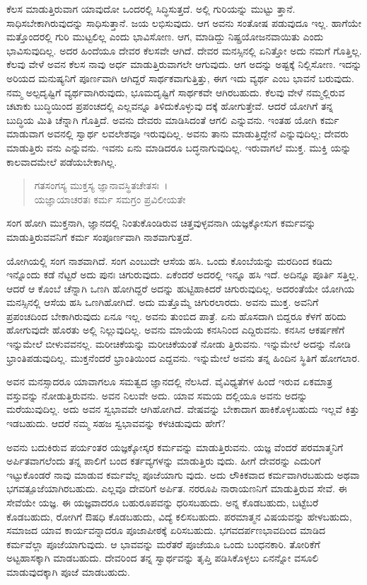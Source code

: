 ಕೆಲಸ ಮಾಡುತ್ತಿರುವಾಗ ಯಾವುದೋ ಒಂದರಲ್ಲಿ ಸಿದ್ಧಿಸುತ್ತದೆ. ಅಲ್ಲಿ ಗುರಿಯನ್ನು ಮುಟ್ಟು ತ್ತಾನೆ. ಸಾಧಿಸಬೇಕಾಗಿರುವುದನ್ನು ಸಾಧಿಸುತ್ತಾನೆ. ಜಯ ಲಭಿಸುವುದು. ಆಗ ಅವನು ಸಂತೋಷ ಪಡುವುದೂ ಇಲ್ಲ. ಹಾಗೆಯೇ ಮತ್ತೊಂದರಲ್ಲಿ ಗುರಿ ಮುಟ್ಟಲಿಲ್ಲ ಎಂದು ಭಾವಿಸೋಣ. ಆಗ, ಮಾಡಿದ್ದು ನಿಷ್ಪ್ರಯೋಜನವಾಯಿತು ಎಂದು ಭಾವಿಸುವುದಿಲ್ಲ. ಅದರ ಹಿಂದೆಯೂ ದೇವರ ಕೆಲಸವೇ ಆಗಿದೆ. ದೇವರ ಮನಸ್ಸಿನಲ್ಲಿ ಏನಿತ್ತೋ ಅದು ನಮಗೆ ಗೊತ್ತಿಲ್ಲ. ಕೆಲವು ವೇಳೆ ಅವನ ಕೆಲಸ ನಾವು ಅರ್ಧ ಮಾಡುತ್ತಿರುವಾಗಲೇ ಆಗುವುದು. ಆಗ ಅದನ್ನು ಅಷ್ಟಕ್ಕೆ ನಿಲ್ಲಿಸೋಣ. ಇದನ್ನು ಅರಿಯದ ಮನುಷ್ಯನಿಗೆ ಪೂರ್ಣವಾಗಿ ಆಗಿದ್ದರೆ ಸಾರ್ಥಕವಾಗುತ್ತಿತ್ತು, ಈಗ ಇದು ವ್ಯರ್ಥ ಎಂಬ ಭಾವನೆ ಬರುವುದು. ನಮ್ಮ ಅಲ್ಪದೃಷ್ಟಿಗೆ ವ್ಯರ್ಥವಾಗಿರುವುದು, ಭೂಮದೃಷ್ಟಿಗೆ ಸಾರ್ಥಕವೇ ಆಗಿರಬಹುದು. ಕೆಲವು ವೇಳೆ ನಮ್ಮಲ್ಲಿರುವ ಚಟಾಕು ಬುದ್ಧಿಯಿಂದ ಪ್ರಪಂಚದಲ್ಲಿ ಎಲ್ಲವನ್ನೂ ತಿಳಿದುಕೊಳ್ಳುವು ದಕ್ಕೆ ಹೋಗುತ್ತೇವೆ. ಆದರೆ ಯೋಗಿಗೆ ತನ್ನ ಬುದ್ಧಿಯ ಮಿತಿ ಚೆನ್ನಾಗಿ ಗೊತ್ತಿದೆ. ಅವನು ದೇವರು ಮಾಡಿಸಿದಂತೆ ಆಗಲಿ ಎನ್ನುವನು. ಇಂತಹ ಯೋಗಿ ಕರ್ಮ ಮಾಡುವಾಗ ಅವನಲ್ಲಿ ಸ್ವಾರ್ಥ ಲವಲೇಶವೂ ಇರುವುದಿಲ್ಲ. ಅವನು ತಾನು ಮಾಡುತ್ತಿದ್ದೇನೆ ಎನ್ನುವುದಿಲ್ಲ; ದೇವರು ಮಾಡುತ್ತಿರು ವನು ಎನ್ನುವನು. ಇವನು ಏನು ಮಾಡಿದರೂ ಬದ್ಧನಾಗುವುದಿಲ್ಲ. ಇರುವಾಗಲೆ ಮುಕ್ತ. ಮುಕ್ತಿ ಯನ್ನು ಕಾಲವಾದಮೇಲೆ ಪಡೆಯಬೇಕಾಗಿಲ್ಲ.

\begin{verse}
ಗತಸಂಗಸ್ಯ ಮುಕ್ತಸ್ಯ ಜ್ಞಾನಾವಸ್ಥಿತಚೇತಸಃ~।\\ಯಜ್ಞಾಯಾಚರತಃ ಕರ್ಮ ಸಮಗ್ರಂ ಪ್ರವಿಲೀಯತೇ 
\end{verse}

{\small ಸಂಗ ಹೋಗಿ ಮುಕ್ತನಾಗಿ, ಜ್ಞಾನದಲ್ಲಿ ನಿಂತುಕೊಂಡಿರುವ ಚಿತ್ತವುಳ್ಳವನಾಗಿ ಯಜ್ಞಕ್ಕೋಸುಗ ಕರ್ಮವನ್ನು ಮಾಡುತ್ತಿರುವವನಿಗೆ ಕರ್ಮ ಸಂಪೂರ್ಣವಾಗಿ ನಾಶವಾಗುತ್ತದೆ.}

ಯೋಗಿಯಲ್ಲಿ ಸಂಗ ನಾಶವಾಗಿದೆ. ಸಂಗ ಎಂಬುದೇ ಆಸೆಯ ಹಸಿ. ಒಂದು ಕೊಂಬೆಯನ್ನು ಮರದಿಂದ ಕಡಿದು ಇನ್ನೊಂದು ಕಡೆ ನೆಟ್ಟರೆ ಅದು ಪುನಃ ಚಿಗುರುವುದು. ಏಕೆಂದರೆ ಅದರಲ್ಲಿ ಇನ್ನೂ ಹಸಿ ಇದೆ. ಅದಿನ್ನೂ ಪೂರ್ತಿ ಸತ್ತಿಲ್ಲ. ಆದರೆ ಆ ಕೊಂಬೆ ಚೆನ್ನಾಗಿ ಒಣಗಿ ಹೋಗಿದ್ದರೆ ಅದನ್ನು ಹುಟ್ಟಿಹಾಕಿದರೆ ಚಿಗುರುವುದಿಲ್ಲ. ಅದರಂತೆಯೇ ಯೋಗಿಯ ಮನಸ್ಸಿನಲ್ಲಿ ಆಸೆಯ ಹಸಿ ಒಣಗಿಹೋಗಿದೆ. ಅದು ಮತ್ತೊಮ್ಮೆ ಚಿಗುರಲಾರದು. ಅವನು ಮುಕ್ತ. ಅವನಿಗೆ ಪ್ರಪಂಚದಿಂದ ಬೇಕಾಗಿರುವುದು ಏನೂ ಇಲ್ಲ. ಅವನು ತುಂಬಿದ ಪಾತ್ರೆ. ಏನು ಹೊಸದಾಗಿ ಬಿದ್ದರೂ ಕೆಳಗೆ ಹರಿದು ಹೋಗುವುದೇ ಹೊರತು ಅಲ್ಲಿ ನಿಲ್ಲುವುದಿಲ್ಲ. ಅವನು ಮಾಯೆಯ ಕನಸಿನಿಂದ ಎದ್ದಿರುವನು. ಕನಸಿನ ಆಕರ್ಷಣೆಗೆ ಇನ್ನುಮೇಲೆ ಬೀಳುವವನಲ್ಲ. ಮರೀಚಿಕೆಯನ್ನು ಮರೀಚಿಕೆಯಂತೆ ನೋಡು ತ್ತಿರುವನು. ಇನ್ನುಮೇಲೆ ಅದನ್ನು ನೋಡಿ ಭ್ರಾಂತಿಪಡುವುದಿಲ್ಲ. ಮುಕ್ತನೆಂದರೆ ಭ್ರಾಂತಿಯಿಂದ ಎದ್ದವನು. ಇನ್ನುಮೇಲೆ ಅವನು ತನ್ನ ಹಿಂದಿನ ಸ್ಥಿತಿಗೆ ಹೋಗಲಾರ.

ಅವನ ಮನಸ್ಸಾದರೂ ಯಾವಾಗಲೂ ಸಮತ್ವದ ಜ್ಞಾನದಲ್ಲಿ ನೆಲಸಿದೆ. ವೈವಿಧ್ಯತೆಗಳ ಹಿಂದೆ ಇರುವ ಏಕಮಾತ್ರ ವಸ್ತುವನ್ನು ನೋಡುತ್ತಿರುವನು. ಅವನ ನಿಲುವೇ ಅದು. ಯಾವ ಸಮಯ ದಲ್ಲಿಯೂ ಅವನು ಅದನ್ನು ಮರೆಯುವುದಿಲ್ಲ. ಅದು ಅವನ ಸ್ವಭಾವವೇ ಆಗಿಹೋಗಿದೆ. ವೇಷವನ್ನು ಬೇಕಾದಾಗ ಹಾಕಿಕೊಳ್ಳಬಹುದು ಇಲ್ಲವೆ ಕಿತ್ತು ಇಡಬಹುದು. ಆದರೆ ನಮ್ಮ ಸಹಜ ಸ್ವಭಾವವನ್ನು ಕಳಚಿಡುವುದು ಹೇಗೆ?

ಅವನು ಬದುಕಿರುವ ಪರ್ಯಂತರ ಯಜ್ಞಕ್ಕೋಸ್ಕರ ಕರ್ಮವನ್ನು ಮಾಡುತ್ತಿರುವನು. ಯಜ್ಞ ವೆಂದರೆ ಪರಮಾತ್ಮನಿಗೆ ಅರ್ಪಿತವಾಗಲೆಂದು ತನ್ನ ಪಾಲಿಗೆ ಬಂದ ಕರ್ತವ್ಯಗಳನ್ನು ಮಾಡುತ್ತಿರು ವುದು. ಹೀಗೆ ದೇವರನ್ನು ಎದುರಿಗೆ ಇಟ್ಟುಕೊಂಡರೆ ನಾವು ಮಾಡುವ ಕರ್ಮವೆಲ್ಲ ಪೂಜೆಯಾಗು ವುದು. ಅದು ಲೌಕಿಕವಾದ ಕರ್ಮವಾಗಿರಬಹುದು ಅಥವಾ ಭಗವತ್ಪೂಜೆಯಾಗಿರಬಹುದು. ಎಲ್ಲವೂ ದೇವರಿಗೆ ಅರ್ಪಿತ. ನರರೂಪಿ ನಾರಾಯಣನಿಗೆ ಮಾಡುತ್ತಿರುವ ಸೇವೆ. ಈ ಸೇವೆಯೇ ಯಜ್ಞ. ಈ ಯಜ್ಞವಾದರೂ ಬಹುರೂಪವನ್ನು ಧರಿಸಬಹುದು. ಅನ್ನ ಕೊಡಬಹುದು, ಬಟ್ಟೆಬರೆ ಕೊಡಬಹುದು, ರೋಗಿಗೆ ಔಷಧಿ ಕೊಡಬಹುದು, ವಿದ್ಯೆ ಕಲಿಸಬಹುದು. ಪರಮಾತ್ಮನ ವಿಷಯವನ್ನು ಹೇಳಬಹುದು, ಸಮಾಜದ ಯಾವ ಕಾರ್ಯವನ್ನಾದರೂ ಪೂಜಾಪೀಠಕ್ಕೆ ಏರಿಸಬಹುದು. ಭಗವದರ್ಪಣಭಾವದಿಂದ ಮಾಡಿದ ಕರ್ಮವೆಲ್ಲಾ ಪೂಜೆಯಾಗುವುದು. ಆ ಭಾವವನ್ನು ಮರೆತರೆ ಪೂಜೆಯೂ ಒಂದು ಬಂಧನಕಾರಿ. ತೋರಿಕೆಗೆ ಅಟ್ಟಹಾಸಕ್ಕಾಗಿ ಮಾಡಬಹುದು. ದೇವರಿಂದ ತನ್ನ ಸ್ವಾರ್ಥವನ್ನು ತೃಪ್ತಿ ಪಡಿಸಿಕೊಳ್ಳಲು ಏನನ್ನೋ ವಸೂಲಿ ಮಾಡುವುದಕ್ಕಾಗಿ ಪೂಜೆ ಮಾಡಬಹುದು.

